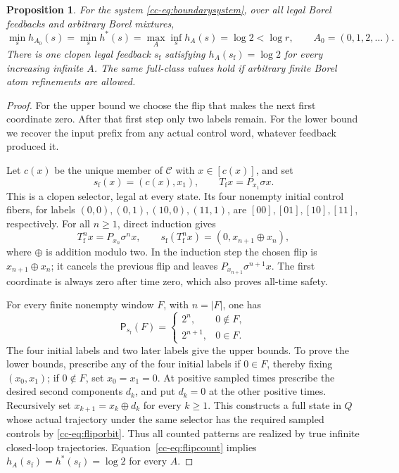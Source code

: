 \documentclass[11pt,reqno]{amsart}
\numberwithin{equation}{section}
\newtheorem{proposition}[theorem]{Proposition}
\theoremstyle{definition}
\theoremstyle{definition}
\newcommand{\Patt}{\mathsf P}
\newcommand{\hpat}{h^{*}}
\begin{document}
\begin{proposition}\label{cc-prop:boundary}
For the system \eqref{cc-eq:boundarysystem}, over all legal Borel feedbacks
and arbitrary Borel mixtures,
\begin{equation}\label{cc-eq:boundaryvalue}
 \min_s h_{A_0}(s)=\min_s\hpat(s)=
 \max_A\inf_s h_A(s)=\log2<\log r,
 \qquad A_0=(0,1,2,\ldots).
\end{equation}
There is one clopen legal feedback $s_{\mathrm f}$ satisfying
$h_A(s_{\mathrm f})=\log2$ for every increasing infinite $A$.
The same full-class values hold if arbitrary finite Borel atom
refinements are allowed.
\end{proposition}
\begin{proof}
For the upper bound we choose the flip that makes the next first
coordinate zero. After that first step only two labels remain. For
the lower bound we recover the input prefix from any actual control
word, whatever feedback produced it.

Let $c(x)$ be the unique member of $\mathcal C$ with $x\in[c(x)]$,
and set
\[
 s_{\mathrm f}(x)=(c(x),x_1),\qquad
 T_{\mathrm f}x=P_{x_1}\sigma x.
\]
This is a clopen selector, legal at every state. Its four nonempty
initial control fibers, for labels $(0,0),(0,1),(10,0),(11,1)$, are
$[00],[01],[10],[11]$, respectively. For all $n\ge1$, direct induction
gives
\begin{equation}\label{cc-eq:fliporbit}
 T_{\mathrm f}^n x=P_{x_n}\sigma^n x,
 \qquad s_{\mathrm f}(T_{\mathrm f}^n x)
        =(0,x_{n+1}\mathbin\oplus x_n),
\end{equation}
where $\oplus$ is addition modulo two. In the induction step the
chosen flip is $x_{n+1}\oplus x_n$; it cancels the previous flip and
leaves $P_{x_{n+1}}\sigma^{n+1}x$. The first coordinate is always zero
after time zero, which also proves all-time safety.

For every finite nonempty window $F$, with $n=|F|$, one has
\begin{equation}\label{cc-eq:flipcount}
 \Patt_{s_{\mathrm f}}(F)=
 \begin{cases}2^n,&0\notin F,\\2^{n+1},&0\in F.\end{cases}
\end{equation}
The four initial labels and two later labels give the upper bounds.
To prove the lower bounds, prescribe any of the four initial labels
if $0\in F$, thereby fixing $(x_0,x_1)$; if $0\notin F$, set
$x_0=x_1=0$. At positive sampled times prescribe the desired second
components $d_k$, and put $d_k=0$ at the other positive times.
Recursively set $x_{k+1}=x_k\oplus d_k$ for every $k\ge1$.
This constructs a full state in $Q$ whose actual trajectory under the
same selector has the required sampled controls by
\eqref{cc-eq:fliporbit}. Thus all counted patterns are realized by true
infinite closed-loop trajectories. Equation~\eqref{cc-eq:flipcount}
implies $h_A(s_{\mathrm f})=\hpat(s_{\mathrm f})=\log2$ for every $A$.


\end{proof}
\end{document}
